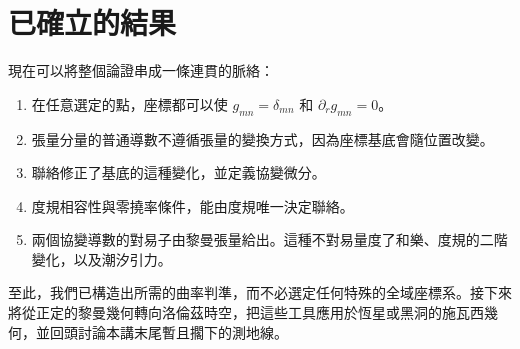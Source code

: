 \begin{classroomqa}
\end{classroomqa}

\section{已確立的結果}

現在可以將整個論證串成一條連貫的脈絡：
\begin{enumerate}
 \item 在任意選定的點，座標都可以使
 \(g_{mn}=\delta_{mn}\) 和 \(\partial_rg_{mn}=0\)。
 \item 張量分量的普通導數不遵循張量的變換方式，因為座標基底會隨位置改變。
 \item 聯絡修正了基底的這種變化，並定義協變微分。
 \item 度規相容性與零撓率條件，能由度規唯一決定聯絡。
 \item 兩個協變導數的對易子由黎曼張量給出。這種不對易量度了和樂、度規的二階變化，以及潮汐引力。
\end{enumerate}

至此，我們已構造出所需的曲率判準，而不必選定任何特殊的全域座標系。接下來將從正定的黎曼幾何轉向洛倫茲時空，把這些工具應用於恆星或黑洞的施瓦西幾何，並回頭討論本講末尾暫且擱下的測地線。
